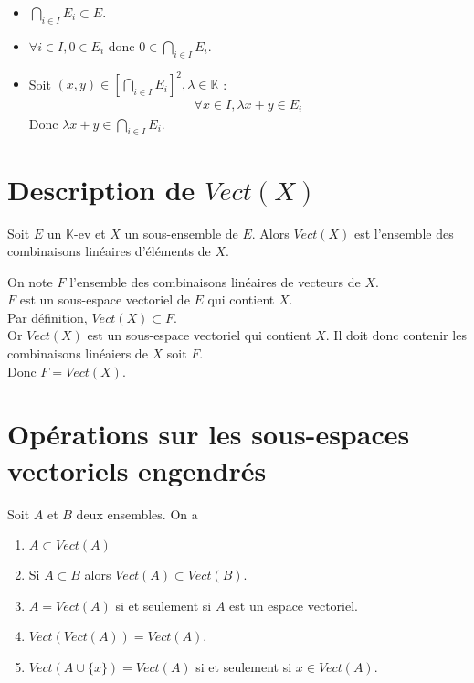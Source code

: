 \documentclass[../main.tex]{subfiles}
\begin{document}
\begin{itemize}
    \item $\bigcap\limits_{i\in I} E_i \subset E$.
    \item $\forall i \in I, 0 \in E_i$ donc $0 \in \bigcap\limits_{i\in I} E_i$.
    \item Soit $(x, y) \in \left[\bigcap\limits_{i \in I} E_i \right]^2, \lambda \in \mathbb{K}$ : 
    \begin{align*}
        \forall x \in I, \lambda x + y \in E_i
    \end{align*}
    Donc $\lambda x + y \in \bigcap\limits_{i\in I} E_i$.
\end{itemize}

\section{Description de $Vect(X)$}
\begin{tcolorbox}[title=Propostion 20.34, title filled=false, colframe=lightblue, colback=lightblue!10!white]
    Soit $E$ un $\mathbb{K}$-ev et $X$ un sous-ensemble de $E$. Alors $Vect(X)$ est l'ensemble des combinaisons linéaires d'éléments de $X$. 
\end{tcolorbox}

\noindent On note $F$ l'ensemble des combinaisons linéaires de vecteurs de $X$. \\
$F$ est un sous-espace vectoriel de $E$ qui contient $X$. \\
Par définition, $Vect(X) \subset F$. \\
Or $Vect(X)$ est un sous-espace vectoriel qui contient $X$. Il doit donc contenir les combinaisons linéaiers de $X$ soit $F$. \\
Donc $\boxed{F = Vect(X)}$.

\section{Opérations sur les sous-espaces vectoriels engendrés}
\begin{tcolorbox}[title=Propostion 20.36, title filled=false, colframe=lightblue, colback=lightblue!10!white]
    Soit $A$ et $B$ deux ensembles. On a
    \begin{enumerate}
        \item $A \subset Vect(A)$
        \item Si $A \subset B$ alors $Vect(A) \subset Vect(B)$. 
        \item $A = Vect(A)$ si et seulement si $A$ est un espace vectoriel.
        \item $Vect(Vect(A)) = Vect(A)$.
        \item $Vect(A \cup \{x\}) = Vect(A)$ si et seulement si $x \in Vect(A)$.
    \end{enumerate}
\end{tcolorbox}
\end{document}
